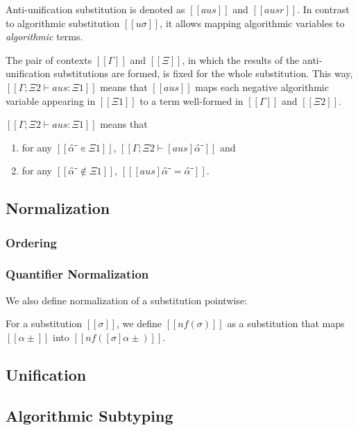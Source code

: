 \documentclass[a4,natbib=false]{article}
\begin{document}
Anti-unification substitution is denoted as $[[aus]]$ and $[[ausr]]$.
In contrast to algorithmic substitution $[[uσ]]$,
it allows mapping algorithmic variables to
\emph{algorithmic} terms.

The pair of contexts $[[Γ]]$ and $[[Ξ]]$,
in which the results of the anti-unification substitutions 
are formed, is fixed for the whole substitution.
This way, $[[Γ; Ξ2 ⊢ aus : Ξ1]]$ means that $[[aus]]$ maps each negative algorithmic
variable appearing in $[[Ξ1]]$ to a term well-formed in $[[Γ]]$ and $[[Ξ2]]$.

\begin{definition}
  $[[Γ; Ξ2 ⊢ aus : Ξ1]]$ means that
  \begin{enumerate}
    \item for any $[[ α̂⁻ ∊ Ξ1]]$, $[[ Γ; Ξ2 ⊢ [aus]α̂⁻ ]]$ and
    \item for any $[[ α̂⁻ ∉ Ξ1]]$, $[[ [aus]α̂⁻ = α̂⁻ ]]$.
  \end{enumerate}
\end{definition}

\subsection{Normalization}

\subsubsection{Ordering}
\ottdefnsOrder

\subsubsection{Quantifier Normalization}
\ottdefnsNrm

We also define normalization of a substitution pointwise:
\begin{definition}
  For a substitution $[[σ]]$, we define $[[nf(σ)]]$
  as a substitution that maps $[[α±]]$ into $[[nf([σ]α±)]]$.
\end{definition}

\subsection{Unification}
\ottdefnsU

\subsection{Algorithmic Subtyping}
\ottdefnsA
\end{document}
